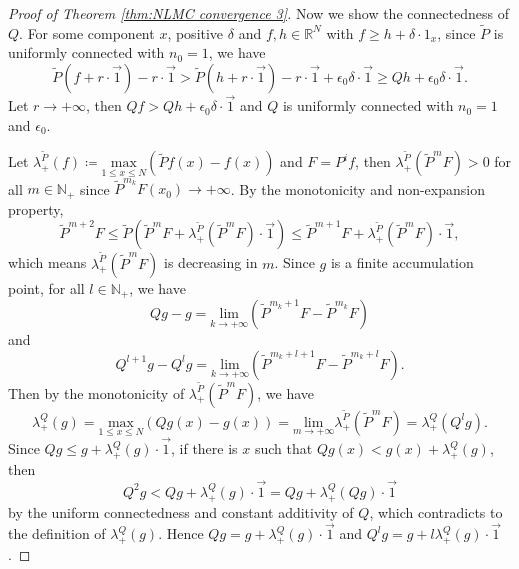 \documentclass[10pt,a4paper]{amsart}
\begin{document}
\begin{proof}[Proof of Theorem \ref{thm:NLMC convergence 3}]
Now we show the connectedness of $Q$. For some component $x$, positive
$\delta$ and $f,h\in\mathbb{R}^{N}$ with $f\geq h+\delta\cdot1_{x}$,
since $\tilde{P}$ is uniformly connected with $n_{0}=1$, we have
\[
\tilde{P}\left(f+r \cdot \overrightarrow{1}\right)-r \cdot \overrightarrow{1}>\tilde{P}\left(h+r \cdot \overrightarrow{1}\right)-r\cdot \overrightarrow{1}+\epsilon_{0}\delta \cdot \overrightarrow{1}\geq Qh+\epsilon_{0}\delta \cdot \overrightarrow{1}.
\]
Let $r\to+\infty$, then $Qf>Qh+\epsilon_{0}\delta \cdot \overrightarrow{1}$ and $Q$ is
uniformly connected with $n_{0}=1$ and $\epsilon_{0}$.

Let $\lambda_{+}^{\tilde{P}}(f)\coloneqq\underset{1\leq x\leq N}{\text{max}}\left(\tilde{P}f(x)-f(x)\right)$
and $F=P^{i}f$, then $\lambda_{+}^{\tilde{P}}(\tilde{P}^{m}F)>0$
for all $m\in\mathbb{N}_{+}$ since $\tilde{P}^{m_{k}}F(x_{0})\to+\infty$. By the
monotonicity and non-expansion property, 
\[
\tilde{P}^{m+2}F\leq\tilde{P}\left(\tilde{P}^{m}F+\lambda_{+}^{\tilde{P}}(\tilde{P}^{m}F) \cdot \overrightarrow{1}\right)\leq\tilde{P}^{m+1}F+\lambda_{+}^{\tilde{P}}(\tilde{P}^{m}F) \cdot \overrightarrow{1},
\]
which means $\lambda_{+}^{\tilde{P}}(\tilde{P}^{m}F)$ is decreasing
in $m$. Since $g$ is a finite accumulation point, for all $l\in\mathbb{N}_{+}$,
we have 
\[
Qg-g=\underset{k\to+\infty}{\text{lim}}\left(\tilde{P}^{m_{k}+1}F-\tilde{P}^{m_{k}}F\right)
\]
and 
\[
Q^{l+1}g-Q^{l}g=\underset{k\to+\infty}{\text{lim}}\left(\tilde{P}^{m_{k}+l+1}F-\tilde{P}^{m_{k}+l}F\right).
\]
Then by the monotonicity of $\lambda_{+}^{\tilde{P}}(\tilde{P}^{m}F)$,
we have 
\[
\lambda_{+}^{Q}(g)=\underset{1\leq x\leq N}{\text{max}}\left(Qg(x)-g(x)\right)=\underset{m\to+\infty}{\text{lim}}\lambda_{+}^{\tilde{P}}(\tilde{P}^{m}F)=\lambda_{+}^{Q}(Q^{l}g).
\]
Since $Qg\leq g+\lambda_{+}^{Q}(g)\cdot \overrightarrow{1}$, if there is $x$ such that $Qg(x)<g(x)+\lambda_{+}^{Q}(g)$,
then 
\[
Q^{2}g<Qg+\lambda_{+}^{Q}(g)\cdot \overrightarrow{1}=Qg+\lambda_{+}^{Q}(Qg)\cdot \overrightarrow{1}
\]
by the uniform connectedness and constant additivity of $Q$, which
contradicts to the definition of $\lambda_{+}^{Q}(g)$. Hence $Qg=g+\lambda_{+}^{Q}(g)\cdot \overrightarrow{1}$
and $Q^{l}g=g+l\lambda_{+}^{Q}(g)\cdot \overrightarrow{1}$.


\end{proof}
\end{document}
